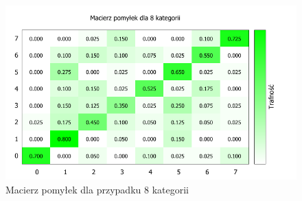 \begin{figure}[h]
	\centering
	\includegraphics[scale=1.1]{graphics/04_interpretacja_wynikow/confusion-matrix-8.pdf}
	\caption{ Macierz pomyłek dla przypadku 8 kategorii }
	\label{fig:confusion-matrix-8}
\end{figure}